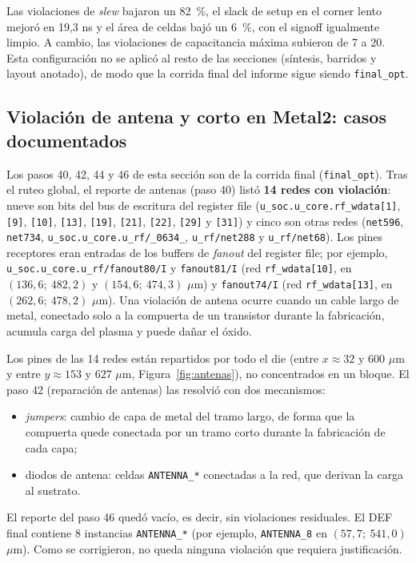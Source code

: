 \documentclass[11pt,letterpaper]{article}
\newcommand{\code}[1]{\texttt{#1}}
\begin{document}
Las violaciones de \textit{slew} bajaron un 82~\%, el slack de setup en el corner lento mejoró en 19,3 ns y el área de celdas bajó un 6~\%, con el signoff igualmente limpio. A cambio, las violaciones de capacitancia máxima subieron de 7 a 20. Esta configuración no se aplicó al resto de las secciones (síntesis, barridos y layout anotado), de modo que la corrida final del informe sigue siendo \code{final\_opt}.

\subsection{Violación de antena y corto en Metal2: casos documentados}

Los pasos 40, 42, 44 y 46 de esta sección son de la corrida final (\code{final\_opt}). Tras el ruteo global, el reporte de antenas (paso 40) listó \textbf{14 redes con violación}: nueve son bits del bus de escritura del register file (\code{u\_soc.u\_core.rf\_wdata[1]}, \code{[9]}, \code{[10]}, \code{[13]}, \code{[19]}, \code{[21]}, \code{[22]}, \code{[29]} y \code{[31]}) y cinco son otras redes (\code{net596}, \code{net734}, \code{u\_soc.u\_core.u\_rf/\_0634\_}, \code{u\_rf/net288} y \code{u\_rf/net68}). Los pines receptores eran entradas de los buffers de \textit{fanout} del register file; por ejemplo, \code{u\_soc.u\_core.u\_rf/fanout80/I} y \code{fanout81/I} (red \code{rf\_wdata[10]}, en $(136{,}6;\ 482{,}2)$ y $(154{,}6;\ 474{,}3)$ $\mu$m) y \code{fanout74/I} (red \code{rf\_wdata[13]}, en $(262{,}6;\ 478{,}2)$ $\mu$m). Una violación de antena ocurre cuando un cable largo de metal, conectado solo a la compuerta de un transistor durante la fabricación, acumula carga del plasma y puede dañar el óxido.

Los pines de las 14 redes están repartidos por todo el die (entre $x\approx32$ y $600$ $\mu$m y entre $y\approx153$ y $627$ $\mu$m, Figura~\ref{fig:antenas}), no concentrados en un bloque. El paso 42 (reparación de antenas) las resolvió con dos mecanismos:
\begin{itemize}
  \item \textit{jumpers}: cambio de capa de metal del tramo largo, de forma que la compuerta quede conectada por un tramo corto durante la fabricación de cada capa;
  \item diodos de antena: celdas \code{ANTENNA\_*} conectadas a la red, que derivan la carga al sustrato.
\end{itemize}
El reporte del paso 46 quedó vacío, es decir, sin violaciones residuales. El DEF final contiene 8 instancias \code{ANTENNA\_*} (por ejemplo, \code{ANTENNA\_8} en $(57{,}7;\ 541{,}0)$ $\mu$m). Como se corrigieron, no queda ninguna violación que requiera justificación.
\end{document}
